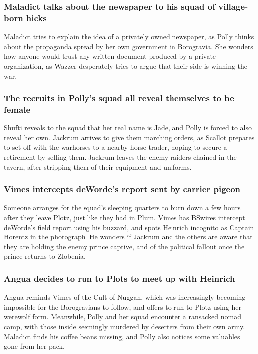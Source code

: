 \subsubsection{\Gls{Maladict} talks about the newspaper to his squad of village-born hicks}
\Gls{Maladict} tries to explain the idea of a privately owned newspaper, as \Gls{Polly} thinks about
the propaganda spread by her own government in Borogravia. She wonders how anyone would trust any
written document produced by a private organization, as \Gls{Wazzer} desperately tries to argue that
their side is winning the war.

\subsubsection{The recruits in \Gls{Polly}'s squad all reveal themselves to be female}
\Gls{Shufti} reveals to the squad that her real name is \Gls{Jade}, and \Gls{Polly} is forced to
also reveal her own. \Gls{Jackrum} arrives to give them marching orders, as \Gls{Scallot} prepares
to set off with the warhorses to a nearby horse trader, hoping to secure a retirement by selling
them. \Gls{Jackrum} leaves the enemy raiders chained in the tavern, after stripping them of their
equipment and uniforms.

\subsubsection{\Gls{Vimes} intercepts \Gls{deWorde}'s report sent by carrier pigeon}
Someone arranges for the squad's sleeping quarters to burn down a few hours after they leave Plotz,
just like they had in Plum. \Gls{Vimes} has \Gls{BSwires} intercept \Gls{deWorde}'s field report
using his buzzard, and spots \Gls{Heinrich} incognito as Captain \Gls{Horentz} in the photograph.
He wonders if \Gls{Jackrum} and the others are aware that they are holding the enemy prince captive,
and of the political fallout once the prince returns to Zlobenia.

\subsubsection{\Gls{Angua} decides to run to Plots to meet up with \Gls{Heinrich}}
\Gls{Angua} reminds \Gls{Vimes} of the Cult of \Gls{Nuggan}, which was increasingly becoming
impossible for the Borogravians to follow, and offers to run to Plotz using her werewolf form.
Meanwhile, \Gls{Polly} and her squad encounter a ransacked nomad camp, with those inside seemingly
murdered by deserters from their own army. \Gls{Maladict} finds his coffee beans missing, and
\Gls{Polly} also notices some valuables gone from her pack.

